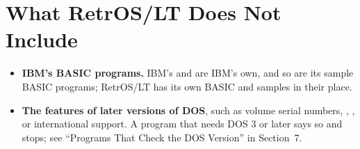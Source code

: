 \section{What RetrOS/LT Does Not Include}

\begin{itemize}
\item \textbf{IBM's BASIC programs.} IBM's  and
   are IBM's own, and so are its sample BASIC programs;
  RetrOS/LT has its own BASIC and samples in their place.
\item \textbf{The features of later versions of DOS}, such as volume
  serial numbers, , ,  or
  international support. A program that needs DOS 3 or later says so and
  stops; see ``Programs That Check the DOS Version'' in Section~7.
\end{itemize}
